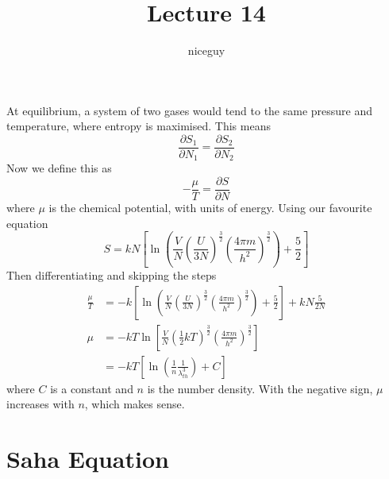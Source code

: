 \documentclass[12pt]{article}
\author{niceguy}
\title{Lecture 14}
\begin{document}
\maketitle

At equilibrium, a system of two gases would tend to the same pressure and temperature, where entropy is maximised. This means
$$\frac{\partial S_1}{\partial N_1} = \frac{\partial S_2}{\partial N_2}$$
Now we define this as
$$-\frac{\mu}{T} = \frac{\partial S}{\partial N}$$
where $\mu$ is the chemical potential, with units of energy. Using our favourite equation
$$S = kN\left[\ln\left(\frac{V}{N}\left(\frac{U}{3N}\right)^{\frac{3}{2}}\left(\frac{4\pi m}{h^2}\right)^{\frac{3}{2}}\right) + \frac{5}{2}\right]$$
Then differentiating and skipping the steps
\begin{align*}
    \frac{\mu}{T} &= -k\left[\ln\left(\frac{V}{N}\left(\frac{U}{3N}\right)^{\frac{3}{2}}\left(\frac{4\pi m}{h^2}\right)^{\frac{3}{2}}\right) + \frac{5}{2}\right] + kN\frac{5}{2N} \\
    \mu &= -kT\ln\left[\frac{V}{N}\left(\frac{1}{2}kT\right)^{\frac{3}{2}}\left(\frac{4\pi m}{h^2}\right)^{\frac{3}{2}}\right] \\
        &= -kT\left[\ln\left(\frac{1}{n} \frac{1}{\lambda_{th}^3}\right) + C\right]
\end{align*}
where $C$ is a constant and $n$ is the number density. With the negative sign, $\mu$ increases with $n$, which makes sense.

\section{Saha Equation}
\end{document}
